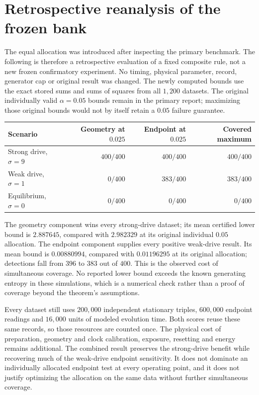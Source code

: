\section{Retrospective reanalysis of the frozen bank}
The equal allocation was introduced after inspecting the primary benchmark.
The following is therefore a retrospective evaluation of a fixed composite
rule, not a new frozen confirmatory experiment. No timing, physical parameter,
record, generator cap or original result was changed. The newly computed
bounds use the exact stored sums and sums of squares from all $1{,}200$
datasets. The original individually valid $\alpha=0.05$ bounds remain in the
primary report; maximizing those original bounds would not by itself retain
a $0.05$ failure guarantee.

\begin{center}
\begin{tabular}{lrrr}
Scenario & Geometry at $0.025$ & Endpoint at $0.025$ & Covered maximum\\
\hline
Strong drive, $\sigma=9$ & $400/400$ & $400/400$ & $400/400$\\
Weak drive, $\sigma=1$ & $0/400$ & $383/400$ & $383/400$\\
Equilibrium, $\sigma=0$ & $0/400$ & $0/400$ & $0/400$\\
\end{tabular}
\end{center}
The geometry component wins every strong-drive dataset; its mean certified
lower bound is $2.887645$, compared with $2.982329$ at its original individual
$0.05$ allocation. The endpoint component supplies every positive weak-drive
result. Its mean bound is $0.00880994$, compared with $0.01196295$ at its
original allocation; detections fall from $396$ to $383$ out of $400$. This is
the observed cost of simultaneous coverage. No reported lower bound exceeds
the known generating entropy in these simulations, which is a numerical
check rather than a proof of coverage beyond the theorem's assumptions.

Every dataset still uses $200{,}000$ independent stationary triples,
$600{,}000$ endpoint readings and $16{,}000$ units of modeled evolution time.
Both scores reuse these same records, so those resources are counted once.
The physical cost of preparation, geometry and clock calibration, exposure,
resetting and energy remains additional. The combined result preserves the
strong-drive benefit while recovering much of the weak-drive endpoint
sensitivity. It does not dominate an individually allocated endpoint test at
every operating point, and it does not justify optimizing the allocation on
the same data without further simultaneous coverage.
